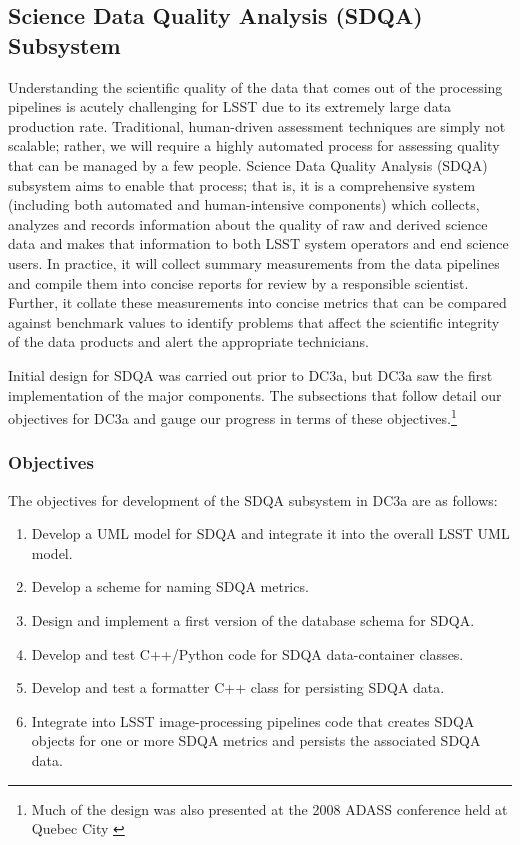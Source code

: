 
\subsection{\label{sdqasubsection}Science Data Quality Analysis (SDQA) Subsystem}

Understanding the scientific quality of the data that comes out of the
processing pipelines is acutely challenging for LSST due to its
extremely large data production rate.  Traditional, human-driven
assessment techniques are simply not scalable; rather, we will require
a highly automated process for assessing quality that can be managed by
a few people.  Science Data Quality Analysis (SDQA) subsystem aims to
enable that process; that is, it is a comprehensive system
(including both automated and human-intensive components) which
collects, analyzes and records information about the quality of raw
and derived science data and makes that information to both LSST
system operators and end science users.  In practice, it will collect
summary measurements from the data pipelines and compile them into
concise reports for review by a responsible scientist.  Further, it
collate these measurements into concise metrics that can be compared
against benchmark values to identify problems that affect the scientific
integrity of the data products and alert the appropriate technicians.  

Initial design for SDQA was carried out prior to DC3a, but DC3a saw
the first implementation of the major components.  The subsections
that follow detail our objectives for DC3a and gauge our progress in
terms of these objectives.\footnote{Much of the design was also
  presented at the 2008 ADASS conference held at Quebec City
  \citep{laher08}}


\subsubsection{Objectives}

   The objectives for development of the SDQA subsystem in DC3a are as follows:

\begin{enumerate} 
\item{Develop a UML model for SDQA and integrate it into the overall LSST UML model.} 
\item{Develop a scheme for naming SDQA metrics. }
\item{Design and implement a first version of the database schema for SDQA.}
\item{Develop and test C++/Python code for SDQA data-container classes.}
\item{Develop and test a formatter C++ class for persisting SDQA data.}
\item{Integrate into LSST image-processing pipelines code that creates SDQA objects
for one or more SDQA metrics and persists the associated SDQA data.}
\end{enumerate}

